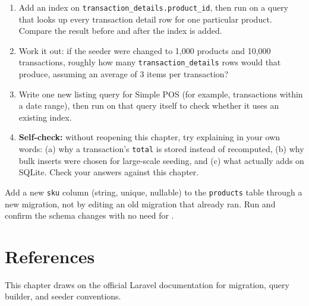 \begin{enumerate}
  \item Add an index on \texttt{transaction\_details.product\_id}, then
    run  on a query that looks up every
    transaction detail row for one particular product. Compare the
    result before and after the index is added.
  \item Work it out: if the seeder were changed to 1,000 products and
    10,000 transactions, roughly how many \texttt{transaction\_details}
    rows would that produce, assuming an average of 3 items per
    transaction?
  \item Write one new listing query for Simple POS (for example,
    transactions within a date range), then run  on that query itself to check whether it uses an existing
    index.
  \item \textbf{Self-check:} without reopening this chapter, try
    explaining in your own words: (a) why a transaction's \texttt{total}
    is stored instead of recomputed, (b) why bulk inserts were chosen
    for large-scale seeding, and (c) what  actually
    adds on SQLite. Check your answers against this chapter.
\end{enumerate}

\begin{challengebox}
Add a new \texttt{sku} column (string, unique, nullable) to the
\texttt{products} table through a new migration, not by editing an old
migration that already ran. Run  and confirm the
schema changes with no need for .
\end{challengebox}

\section{References}

This chapter draws on the official Laravel documentation
\cite{laraveldocs} for migration, query builder, and seeder
conventions.
